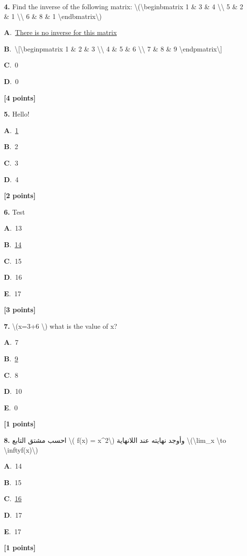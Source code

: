 \documentclass[12pt]{article}
\newcommand{\choice}[3]{%
  \noindent\textbf{#1}.~#2\hfill#3\par\vspace{0.25em}
}
\begin{document}
\noindent \textbf{\textenglish{4.}} {\textenglish{Find the inverse of the following matrix: \textbackslash{}(\textbackslash{}begin{bmatrix} 1 \& 3 \& 4 \textbackslash{}\textbackslash{} 5 \& 2 \& 1 \textbackslash{}\textbackslash{} 6 \& 8 \& 1 \textbackslash{}end{bmatrix}\textbackslash{})}}

\noindent\choice{A}{\underline{{\textenglish{There is no inverse for this matrix}}}}{}
\noindent\choice{B}{{\textenglish{\textbackslash{}[\textbackslash{}begin{pmatrix} 1 \& 2 \& 3 \textbackslash{}\textbackslash{} 4 \& 5 \& 6 \textbackslash{}\textbackslash{} 7 \& 8 \& 9  \textbackslash{}end{pmatrix}\textbackslash{}]}}}{}
\noindent\choice{C}{{\textenglish{0}}}{}
\noindent\choice{D}{{\textenglish{0}}}{}
\hfill \textbf{[4 points]}\vspace{0.5em}

\noindent \textbf{\textenglish{5.}} {\textenglish{Hello!}}

\noindent\choice{A}{\underline{{\textenglish{1}}}}{}
\noindent\choice{B}{{\textenglish{2}}}{}
\noindent\choice{C}{{\textenglish{3}}}{}
\noindent\choice{D}{{\textenglish{4}}}{}
\hfill \textbf{[2 points]}\vspace{0.5em}

\noindent \textbf{\textenglish{6.}} {\textenglish{Test}}

\noindent\choice{A}{{\textenglish{13}}}{}
\noindent\choice{B}{\underline{{\textenglish{14}}}}{}
\noindent\choice{C}{{\textenglish{15}}}{}
\noindent\choice{D}{{\textenglish{16}}}{}
\noindent\choice{E}{{\textenglish{17}}}{}
\hfill \textbf{[3 points]}\vspace{0.5em}

\noindent \textbf{\textenglish{7.}} {\textenglish{\textbackslash{}(x=3+6 \textbackslash{}) what is the value of x?}}

\noindent\choice{A}{{\textenglish{7}}}{}
\noindent\choice{B}{\underline{{\textenglish{9}}}}{}
\noindent\choice{C}{{\textenglish{8}}}{}
\noindent\choice{D}{{\textenglish{10}}}{}
\noindent\choice{E}{{\textenglish{0}}}{}
\hfill \textbf{[1 points]}\vspace{0.5em}

\noindent \textbf{\textenglish{8.}} {\textarabic{احسب مشتق التابع \textbackslash{}( f(x) = x\^{}2\textbackslash{}) وأوجد نهايته عند اللانهاية \textbackslash{}(\textbackslash{}lim\_{x \textbackslash{}to \textbackslash{}infty}f(x)\textbackslash{})}}

\noindent\choice{A}{{\textenglish{14}}}{}
\noindent\choice{B}{{\textenglish{15}}}{}
\noindent\choice{C}{\underline{{\textenglish{16}}}}{}
\noindent\choice{D}{{\textenglish{17}}}{}
\noindent\choice{E}{{\textenglish{17}}}{}
\hfill \textbf{[1 points]}\vspace{0.5em}
\end{document}
